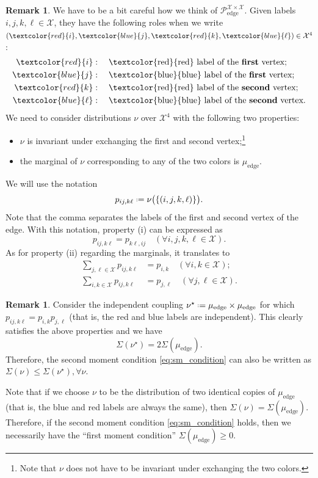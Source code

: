 \documentclass[12pt]{amsart}
\theoremstyle{definition}
\newtheorem{remark}[theorem]{Remark}
\newcommand\Pcedge{\mathcal{P}_\mathrm{edge}}
\newcommand\Xc{\mathcal{X}}
\newcommand\nustar{\nu^{\star}}
\newcommand\muedge{\mu_\mathrm{edge}}
\newcommand{\defeq}{\mathrel{\vcenter{\baselineskip0.5ex \lineskiplimit0pt
                     \hbox{\scriptsize.}\hbox{\scriptsize.}}}%
                     =}
\begin{document}
\begin{remark}
We have to be a bit careful how we think of $\Pcedge^{\Xc \times \Xc}$. Given labels $i,j,k,\ell \in \Xc$, they have the following roles when we write $(\textcolor{red}{i},\textcolor{blue}{j},\textcolor{red}{k},\textcolor{blue}{\ell}) \in \Xc^4$:
%
\begin{align*}
\textcolor{red}{i} &: 
\quad \text{\textcolor{red}{red} label of the \textbf{first} vertex;}\\
\textcolor{blue}{j} &: 
\quad \text{\textcolor{blue}{blue} label of the \textbf{first} vertex;}\\
\textcolor{red}{k} &: 
\quad \text{\textcolor{red}{red} label of the \textbf{second} vertex;}\\
\textcolor{blue}{\ell} &: 
\quad \text{\textcolor{blue}{blue} label of the \textbf{second} vertex.}
\end{align*}
%
We need to consider distributions $\nu$ over $\Xc^4$ with the following two properties: 
%
\begin{itemize}
\item[(i)] $\nu$ is invariant under exchanging the first and second vertex;\footnote{Note that $\nu$ does not have to be invariant under exchanging the two colors.} 
\item[(ii)] the marginal of $\nu$ corresponding to any of the two colors is $\muedge$.
\end{itemize}
%
We will use the notation 
%
\[ p_{ij,k\ell} \defeq 
\nu\big( \{ (i,j,k,\ell) \} \big) .\]
%
Note that the comma separates the labels of the first and second vertex of the edge. With this notation, property (i) can be expressed as  
%
\begin{equation} \label{eq:nu1}
p_{ij,k\ell} = p_{k\ell,ij} 
\quad (\forall i,j,k,\ell \in \Xc) .
\end{equation}
%
As for property (ii) regarding the marginals, it translates to 
%
\begin{align}
\sum_{j,\ell \in \Xc} p_{ij,k\ell} &= p_{i,k} 
\quad (\forall i,k \in \Xc); \label{eq:nu2} \\
\sum_{i,k \in \Xc} p_{ij,k\ell} &= p_{j,\ell} 
\quad (\forall j,\ell \in \Xc). \label{eq:nu3}
\end{align}
%
\end{remark}

%
\begin{remark} \label{rem:indep_coupling}
Consider the independent coupling $\nustar \defeq \muedge \times \muedge$ for which $p_{ij,k\ell}=p_{i,k}p_{j,\ell}$ (that is, the red and blue labels are independent). This clearly satisfies the above properties and we have 
%
\[ \Sigma(\nustar) = 2 \Sigma(\muedge) .\]
%
Therefore, the second moment condition \eqref{eq:sm_condition} can also be written as $\Sigma(\nu) \leq \Sigma(\nustar), \forall \nu$.

Note that if we choose $\nu$ to be the distribution of two identical copies of $\muedge$ (that is, the blue and red labels are always the same), then $\Sigma(\nu)=\Sigma(\muedge)$. Therefore, if the second moment condition \eqref{eq:sm_condition} holds, then we necessarily have the ``first moment condition'' $\Sigma(\muedge) \geq 0$. 
\end{remark}
%
\end{document}
